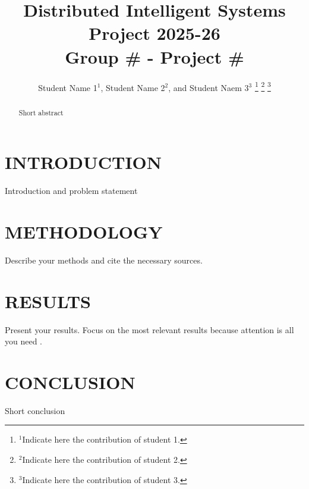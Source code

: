 \documentclass[letterpaper, 10 pt, conference]{ieeeconf}
\title{\LARGE \bf
Distributed Intelligent Systems Project 2025-26 \\
\large Group \# - Project \#
}
\author{Student Name 1$^{1}$, Student Name 2$^{2}$, and Student Naem 3$^{3}$%
    \thanks{$^{1}$Indicate here the contribution of student 1.}%
    \thanks{$^{2}$Indicate here the contribution of student 2.}%
    \thanks{$^{3}$Indicate here the contribution of student 3.}%
}
\begin{document}
\maketitle
\thispagestyle{empty}
\pagestyle{empty}


\begin{abstract}
Short abstract

\end{abstract}


\section{INTRODUCTION}
Introduction and problem statement

\section{METHODOLOGY}
Describe your methods and cite the necessary sources.

\section{RESULTS}
Present your results. Focus on the most relevant results because attention is all you need \cite{vaswani2017attention}.

\section{CONCLUSION}
Short conclusion



\addtolength{\textheight}{-12cm}   



\printbibliography
\end{document}
